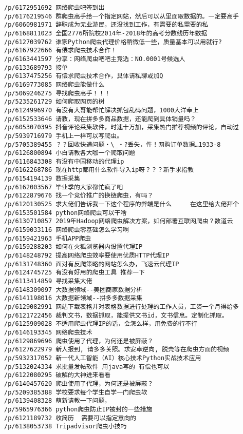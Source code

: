 \documentclass[11pt]{article}
\begin{document}
    \begin{Verbatim}[commandchars=\\\{\}]
/p/6172951692 网络爬虫吧签到出
/p/6176219546 群爬虫高手给一个指定网站，然后可以从里面取数据的。一定要高手
/p/6060981971 辞职成为无业游民，还没找到工作，有需要的私需要的私
/p/6168811023 全国2776所院校2014年-2018年的高考分数线历年数据
/p/6127039762 谁家Python爬虫代理价格稍微低一些，质量基本可以用就行?
/p/6167922666 有偿求爬虫技术合作！
/p/6163441597 分享：网络爬虫吧吧主竞选：NO.0001号候选人
/p/6133689793 接单
/p/6137475256 有偿求爬虫技术合作，具体请私聊或加Q
/p/6169773085 网络爬虫能做什么
/p/5069246275 寻找爬虫高手！！！
/p/5235261729 如何爬取网页的树
/p/6124996970 有没有大哥能帮忙解决抓包乱码问题，1000大洋奉上
/p/6152533646 请教，现在拼多多商品数据，还能爬到具体销量吗？
/p/6053070395 抖音评论采集软件，时速十万加，采集热门推荐视频的评论，自动过
/p/5939716979 手机上一样可以写爬虫。
/p/5705389455 ？？回收快递问题・\_・?丢失，件！网购订单数据…1933-8
/p/6126800894 小白请教各大咖一个爬取问题
/p/6116843308 有没有中国移动的代理ip
/p/6162268786 现在http都用什么软件导入ip呀？？？新手求指教
/p/6154194139 数据采集
/p/6162003567 毕业季的大家都忙疯了吧
/p/6122879676 找一个竞价推广的换链爬虫，有吗？
/p/6120130525 求大佬们告诉我一下这个程序的弊端是什么     在这里给大佬拜个
/p/6153501584 python网络爬虫可以干啥
/p/6130710857 2019年Hadoop网络爬虫解决方案，如何部署互联网爬虫？数道云
/p/6159033116 网络爬虫零基础怎么学习啊
/p/6159421963 手机APP爬虫
/p/6159288203 如何在火狐浏览器内设置代理IP
/p/6148248792 提高网络爬虫效率要使用优质HTTP代理IP
/p/6131748360 面对有反爬策略的网站怎么办，飞速云代理IP
/p/6124745725 有没有好用的爬虫工具 推荐一下
/p/6113414859 寻找采集大佬
/p/6148309097 大数据领域--美团商家数据分析
/p/6141198016 大数据新领域--拼多多数据采集
/p/6129082991 网站下载表格并对表格数据进行处理的工作人员，工资一个月得给多
/p/6121722456 裁判文书，数据抓取，能提供文书id，文书信息。定制化抓取。
/p/6125909028 不适用爬虫代理IP的话，会怎么样，用免费的行不行
/p/6146193345 网络爬虫技术
/p/6129869696 爬虫使用了代理，为何还是被屏蔽？
/p/6127622979 新人报到, 请多多关照。求安卓逆向, 脱壳等在爬虫方面的视频
/p/5932317052 新一代人工智能（AI）核心技术Python实战技术应用
/p/5132024334 求批量发帖软件 用java写的 有偿也可以
/p/6122080295 破解的大神进来看看
/p/6140457620 爬虫使用了代理，为何还是被屏蔽？
/p/5209385388 学校要求每个学生自学一门爬虫软
/p/6139408328 萌新请教一下问题，
/p/5965976366 python爬虫防止IP被封的一些措施
/p/6121189732 收简历  需要可以指定意向的
/p/6138053738 Tripadvisor爬虫小技巧

    \end{Verbatim}


    
    
    
    
\end{document}
